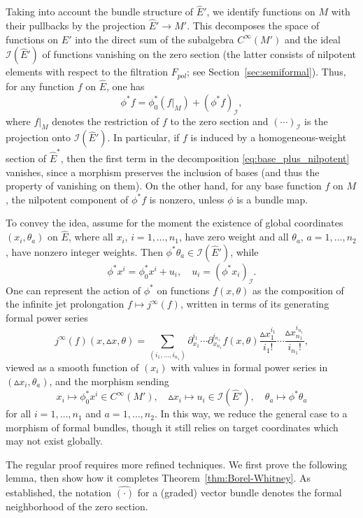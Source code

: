 \documentclass[a4paper,12pt]{amsart}
\newcommand{\pt}{\partial}
\newcommand{\cI}{{\mathcal I}}
\newcommand{\wE}{\widehat{E}}
\newcommand{\vx}{{\vartriangle\!\!x}}
\begin{document}
 \smallskip\noindent
Taking into account the bundle structure of $\wE'$, we identify functions on $M$ with their pullbacks by the projection $\wE' \to M'$. This decomposes the space of functions on $\wE'$ into the direct sum of the subalgebra $C^\infty(M')$ and the ideal $\cI(\wE')$ of functions vanishing on the zero section (the latter consists of nilpotent elements with respect to the filtration ${F_{pol}}$; see Section~\ref{sec:semiformal}). Thus, for any function $f$ on $\wE$, one has
\begin{equation}\label{eq:base_plus_nilpotent}
  \phi^* f = \phi_0^* (f|_M) + (\phi^* f)_{\cI},
\end{equation}
where $f|_M$ denotes the restriction of $f$ to the zero section and $(\cdots)_{\cI}$ is the projection onto $\cI(\wE')$. In particular, if $f$ is induced by a homogeneous-weight section of $\wE^*$, then the first term in the decomposition \eqref{eq:base_plus_nilpotent} vanishes, since a morphism preserves the inclusion of bases (and thus the property of vanishing on them). On the other hand, for any base function $f$ on $M$, the nilpotent component of $\phi^*f$ is nonzero, unless $\phi$ is a bundle map.  

\smallskip\noindent 
To convey the idea, assume for the moment the existence of global coordinates $(x_i, \theta_a)$ on $\wE$, where all $x_i$, $i=1,\ldots,n_1$, have zero weight and all $\theta_a$, $a=1,\ldots,n_2$, have nonzero integer weights.
 Then $\phi^*\theta_a \in \cI(\wE')$, while
\[
\phi^* x^i = \phi_0^* x^i + u_i, \quad u_i = (\phi^* x_i)_{\cI}.
\]
One can represent the action of $\phi^*$ on functions $f(x,\theta)$ as the composition of the infinite jet prolongation $f \mapsto j^\infty(f)$, written in terms of its generating formal power series
\[
j^\infty(f)(x,\vx,\theta) = \sum_{(i_1,\ldots,i_{n_1})} {\pt_{x_1}^{i_1}} \cdots {\pt_{x_{n_1}}^{i_{n_1}}} f(x,\theta) \frac{\vx_1^{i_1}}{i_1!} \cdots \frac{\vx_{n_1}^{i_{n_1}}}{i_{n_1}!} ,
\]
viewed as a smooth function of $(x_i)$ with values in formal power series in $(\vx_i,\theta_a)$, and the morphism sending
\[
x_i \mapsto \phi_0^* x^i \in C^\infty(M'),\quad \vx_i \mapsto u_i \in \cI(\wE'),\quad \theta_a \mapsto \phi^*\theta_a
\]
for all $i=1,\ldots,n_1$ and $a=1,\ldots,n_2$. In this way, we reduce the general case to a morphism of formal bundles, though it still relies on target coordinates which may not exist globally.


\smallskip\noindent
The regular proof requires more refined techniques. We first prove the following lemma, then show how it completes Theorem~\ref{thm:Borel-Whitney}. As established, the notation $\hat{(\cdot)}$ for a (graded) vector bundle denotes the formal neighborhood of the zero section.
\end{document}

